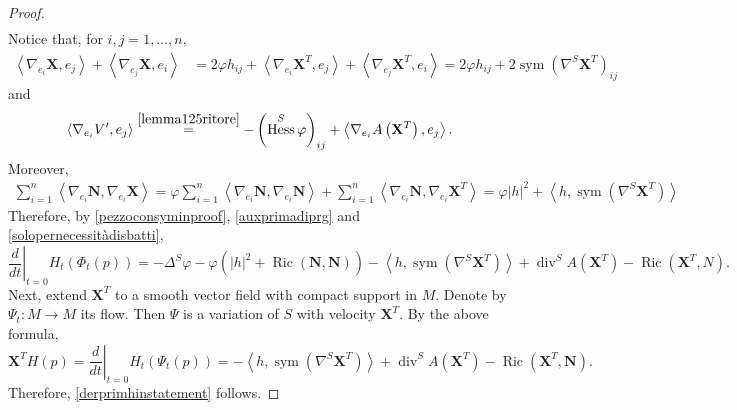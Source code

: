 \documentclass[11pt]{amsart}
\newcommand{\n}[1]{\nabla^\varepsilon_{ #1 }}
\newcommand{\X}{\mathbf{X}}
\renewcommand{\n}{\mathbf{N}}
\DeclareMathOperator{\ric}{Ric}
\DeclareMathOperator{\divv}{div}
\DeclareMathOperator{\hess}{Hess}
\DeclareMathOperator{\sym}{sym}
\theoremstyle{definition}
\theoremstyle{remark}
\numberwithin{equation}{section}
\begin{document}
\begin{proof}
\begin{equation*}
\begin{split}
    \end{split}
\end{equation*}
Notice that, for $i,j=1,\ldots,n,$
\begin{equation}\label{pezzoconsyminproof}
    \begin{split}
        \left\langle\nabla_{e_i} \X,e_j\right\rangle+\left\langle \nabla_{e_j} \X,e_i\right\rangle&=2\varphi h_{ij}+ \left\langle\nabla_{e_i}  \X^T,e_j\right\rangle+\left\langle \nabla_{e_j}  \X^T,e_i\right\rangle=2\varphi h_{ij}+2\sym\left(\nabla^S  \X^T\right)_{ij}
    \end{split}
\end{equation}
and
\begin{equation}\label{auxprimadiprg}
    \left\langle\nabla_{e_i}V',e_j\right\rangle\overset{\eqref{lemma125ritore}}{=}-\left(\hess^S\varphi\right)_{ij}+\left\langle \nabla_{e_i}A\left( \X^T\right),e_j\right\rangle.
\end{equation}
Moreover,
\begin{equation}\label{solopernecessitàdisbatti}
    \begin{split}
        \sum_{i=1}^n\left\langle\nabla_{e_i}\n ,\nabla_{e_i}\X\right\rangle=\varphi\sum_{i=1}^n\left\langle\nabla_{e_i}\n ,\nabla_{e_i}\n \right\rangle+\sum_{i=1}^n\left\langle\nabla_{e_i}\n ,\nabla_{e_i} \X^T\right\rangle=\varphi|h|^2+\left\langle h,\sym\left(\nabla^S  \X^T\right)\right\rangle
    \end{split}
\end{equation}
Therefore, by \eqref{pezzoconsyminproof}, \eqref{auxprimadiprg} and \eqref{solopernecessitàdisbatti},
\begin{equation*}
     \left.\frac{d}{dt}\right|_{t=0}H_t(\Phi_t(p))=-\Delta^S\varphi-\varphi\left(|h|^2+\ric(\n,\n)\right)-\left\langle h,\sym\left(\nabla^S  \X^T\right)\right\rangle+\divv^SA\left( \X^T\right)-\ric( \X^T,N).
\end{equation*}
Next, extend $ \X^T$ to a smooth vector field with compact support in $M$. Denote by $\Psi_t:M\to M$ its flow. Then $\Psi$ is a variation of $S$ with velocity $ \X^T$. By the above formula,
\begin{equation*}
     \X^T H(p)=  \left.\frac{d}{dt}\right|_{t=0}H_t(\Psi_t(p))=-\left\langle h,\sym\left(\nabla^S  \X^T\right)\right\rangle+\divv^S A\left( \X^T\right)-\ric( \X^T,\n).
\end{equation*}
Therefore, \eqref{derprimhinstatement} follows.

\end{proof}
\end{document}
